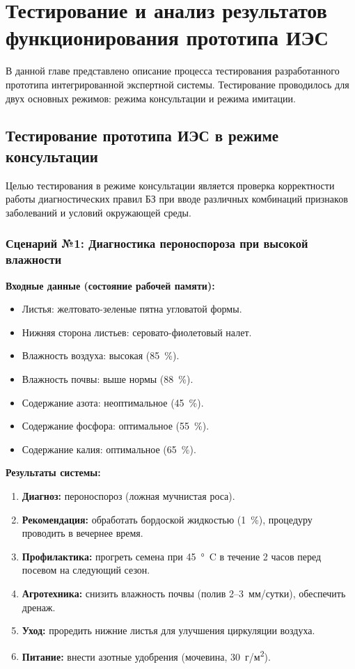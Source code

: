 \chapter{Тестирование и анализ результатов функционирования прототипа ИЭС}
\label{chapter4}

В данной главе представлено описание процесса тестирования разработанного прототипа интегрированной экспертной системы. Тестирование проводилось для двух основных режимов: режима консультации и режима имитации.

\section{Тестирование прототипа ИЭС в режиме консультации}

Целью тестирования в режиме консультации является проверка корректности работы диагностических правил БЗ при вводе различных комбинаций признаков заболеваний и условий окружающей среды.

\subsection{Сценарий №1: Диагностика пероноспороза при высокой влажности}

\textbf{Входные данные (состояние рабочей памяти):}
\begin{itemize}
    \item Листья: желтовато-зеленые пятна угловатой формы.
    \item Нижняя сторона листьев: серовато-фиолетовый налет.
    \item Влажность воздуха: высокая (\SI{85}{\%}).
    \item Влажность почвы: выше нормы (\SI{88}{\%}).
    \item Содержание азота: неоптимальное (\SI{45}{\%}).
    \item Содержание фосфора: оптимальное (\SI{55}{\%}).
    \item Содержание калия: оптимальное (\SI{65}{\%}).
\end{itemize}

\textbf{Результаты системы:}
\begin{enumerate}
    \item \textbf{Диагноз:} пероноспороз (ложная мучнистая роса).
    \item \textbf{Рекомендация:} обработать бордоской жидкостью (\SI{1}{\%}), процедуру проводить в вечернее время.
    \item \textbf{Профилактика:} прогреть семена при \SI{45}{\degree C} в течение 2 часов перед посевом на следующий сезон.
    \item \textbf{Агротехника:} снизить влажность почвы (полив 2--3~мм/сутки), обеспечить дренаж.
    \item \textbf{Уход:} проредить нижние листья для улучшения циркуляции воздуха.
    \item \textbf{Питание:} внести азотные удобрения (мочевина, \SI{30}{г/м^2}).
\end{enumerate}

